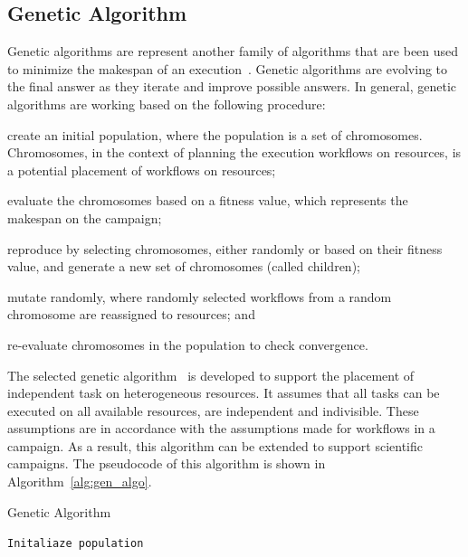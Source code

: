 \subsection{Genetic Algorithm}
\label{algo:gen}
Genetic algorithms are represent another family of algorithms that are been used to minimize the makespan of an execution~\cite{dong2006scheduling}.
Genetic algorithms are evolving to the final answer as they iterate and improve possible answers.
In general, genetic algorithms are working based on the following procedure:
\begin{inparaenum}[(i)]
    \item create an initial population, where the population is a set of chromosomes. 
          Chromosomes, in the context of planning the execution workflows on resources, is a potential placement of workflows on resources;
    \item evaluate the chromosomes based on a fitness value, which represents the makespan on the campaign;
    \item reproduce by selecting chromosomes, either randomly or based on their fitness value, and generate a new set of chromosomes (called children);
    \item mutate randomly, where randomly selected workflows from a random chromosome are reassigned to resources; and
    \item re-evaluate chromosomes in the population to check convergence.
\end{inparaenum}

The selected genetic algorithm~\cite{page2005algorithm} is developed to support the placement of independent task on heterogeneous resources.
It assumes that all tasks can be executed on all available resources, are independent and indivisible.
These assumptions are in accordance with the assumptions made for workflows in a campaign.
As a result, this algorithm can be extended to support scientific campaigns.
The pseudocode of this algorithm is shown in Algorithm~\ref{alg:gen_algo}.

\begin{algorithm}[ht]
    \caption{Genetic Algorithm}
    \label{alg:gen_algo}
    \begin{algorithmic}[1]
        \State \texttt{Initaliaze population}
        \EndWhile
        \EndProcedure
    \end{algorithmic}
\end{algorithm}

